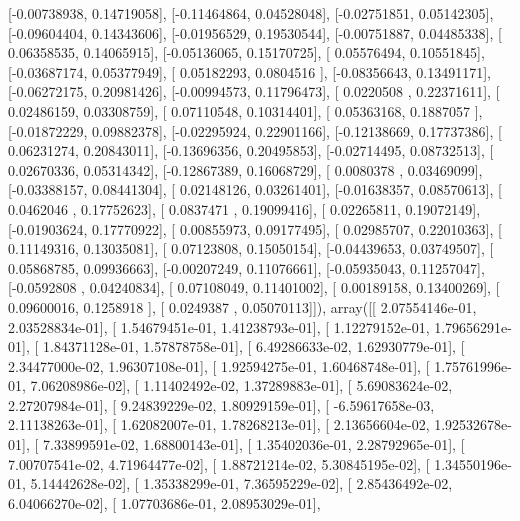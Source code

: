 \documentclass{article}
\begin{document}
       [-0.00738938,  0.14719058],
       [-0.11464864,  0.04528048],
       [-0.02751851,  0.05142305],
       [-0.09604404,  0.14343606],
       [-0.01956529,  0.19530544],
       [-0.00751887,  0.04485338],
       [ 0.06358535,  0.14065915],
       [-0.05136065,  0.15170725],
       [ 0.05576494,  0.10551845],
       [-0.03687174,  0.05377949],
       [ 0.05182293,  0.0804516 ],
       [-0.08356643,  0.13491171],
       [-0.06272175,  0.20981426],
       [-0.00994573,  0.11796473],
       [ 0.0220508 ,  0.22371611],
       [ 0.02486159,  0.03308759],
       [ 0.07110548,  0.10314401],
       [ 0.05363168,  0.1887057 ],
       [-0.01872229,  0.09882378],
       [-0.02295924,  0.22901166],
       [-0.12138669,  0.17737386],
       [ 0.06231274,  0.20843011],
       [-0.13696356,  0.20495853],
       [-0.02714495,  0.08732513],
       [ 0.02670336,  0.05314342],
       [-0.12867389,  0.16068729],
       [ 0.0080378 ,  0.03469099],
       [-0.03388157,  0.08441304],
       [ 0.02148126,  0.03261401],
       [-0.01638357,  0.08570613],
       [ 0.0462046 ,  0.17752623],
       [ 0.0837471 ,  0.19099416],
       [ 0.02265811,  0.19072149],
       [-0.01903624,  0.17770922],
       [ 0.00855973,  0.09177495],
       [ 0.02985707,  0.22010363],
       [ 0.11149316,  0.13035081],
       [ 0.07123808,  0.15050154],
       [-0.04439653,  0.03749507],
       [ 0.05868785,  0.09936663],
       [-0.00207249,  0.11076661],
       [-0.05935043,  0.11257047],
       [-0.0592808 ,  0.04240834],
       [ 0.07108049,  0.11401002],
       [ 0.00189158,  0.13400269],
       [ 0.09600016,  0.1258918 ],
       [ 0.0249387 ,  0.05070113]]), array([[  2.07554146e-01,   2.03528834e-01],
       [  1.54679451e-01,   1.41238793e-01],
       [  1.12279152e-01,   1.79656291e-01],
       [  1.84371128e-01,   1.57878758e-01],
       [  6.49286633e-02,   1.62930779e-01],
       [  2.34477000e-02,   1.96307108e-01],
       [  1.92594275e-01,   1.60468748e-01],
       [  1.75761996e-01,   7.06208986e-02],
       [  1.11402492e-02,   1.37289883e-01],
       [  5.69083624e-02,   2.27207984e-01],
       [  9.24839229e-02,   1.80929159e-01],
       [ -6.59617658e-03,   2.11138263e-01],
       [  1.62082007e-01,   1.78268213e-01],
       [  2.13656604e-02,   1.92532678e-01],
       [  7.33899591e-02,   1.68800143e-01],
       [  1.35402036e-01,   2.28792965e-01],
       [  7.00707541e-02,   4.71964477e-02],
       [  1.88721214e-02,   5.30845195e-02],
       [  1.34550196e-01,   5.14442628e-02],
       [  1.35338299e-01,   7.36595229e-02],
       [  2.85436492e-02,   6.04066270e-02],
       [  1.07703686e-01,   2.08953029e-01],
\end{document}
